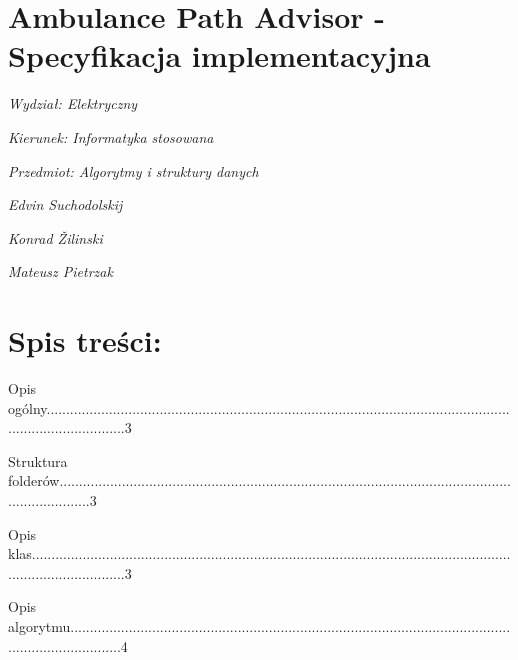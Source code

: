 ﻿\documentclass{article}
\begin{document}
\noindent 

\noindent 

\noindent 

\noindent 

\noindent 

\section{Ambulance Path Advisor -
Specyfikacja implementacyjna}

\noindent 

\noindent 

\noindent 

\noindent 

\noindent 

\noindent 

\noindent 

\noindent 

\noindent \textit{Wydzia{\l}: Elektryczny}

\noindent \textit{Kierunek: Informatyka stosowana}

\noindent \textit{Przedmiot: Algorytmy i struktury danych}

\noindent \textit{}

\noindent \textit{Edvin Suchodolskij}

\noindent \textit{Konrad \v{Z}ilinski}

\noindent \textit{Mateusz Pietrzak}

\noindent 

\eject

\section{ Spis tre\'{s}ci:}

\noindent 

\noindent Opis og\'{o}lny.....................................................................................................................................................3

\noindent Struktura folder\'{o}w.........................................................................................................................................3

\noindent Opis klas.........................................................................................................................................................3

\noindent Opis algorytmu..............................................................................................................................................4
\end{document}
